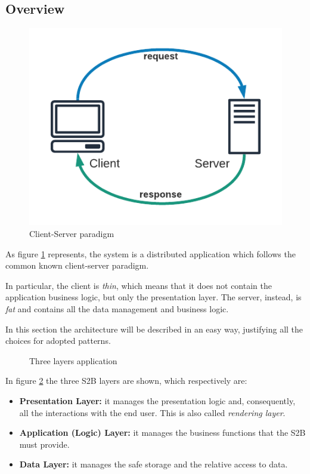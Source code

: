 \documentclass[table, 12pt]{article}
\begin{document}
\subsection{Overview}
\begin{figure}[H]
    \begin{center}
        \includegraphics[width=\textwidth/2]{assets/Architectural-Design/Client-Server.png}
        \caption{Client-Server paradigm}
        \label{client_server_par}
    \end{center}
\end{figure}

As figure \ref{client_server_par} represents, the system is a distributed application which follows the common known client-server paradigm.

In particular, the client is \textit{thin}, which means that it does not contain the application business logic, but only the presentation layer. The server, instead, is \textit{fat} and contains all the data management and business logic.

In this section the architecture will be described in an easy way, justifying all the choices for adopted patterns.

\begin{figure}
    \begin{center}
        \caption{Three layers application}
        \label{three_tier_desc}
    \end{center}
\end{figure}

In figure \ref{three_tier_desc} the three S2B layers are shown, which respectively are:
\begin{itemize}
    \item \textbf{Presentation Layer:} it manages the presentation logic and, consequently, all the interactions with the end user. This is also called \textit{rendering layer}.
    \item \textbf{Application (Logic) Layer:} it manages the business functions that the S2B must provide.
    \item \textbf{Data Layer:} it manages the safe storage and the relative access to data.
\end{itemize}
\end{document}
